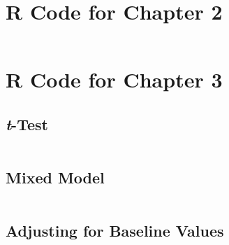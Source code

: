 \documentclass[12pt, TexShade, letterpaper]{report}
\begin{document}
{




}

\appendix
\chapter{R Code for Chapter 2}
    \inputminted{R}{src/ch2.R}

\chapter{R Code for Chapter 3}
\section{\textit{t}-Test}
    \inputminted{R}{src/ch3tTest.R}
\section{Mixed Model}
    \inputminted{R}{src/ch3MixedModel.R}
\section{Adjusting for Baseline Values}
    \inputminted{R}{src/ch3Baselines.R}
\end{document}
